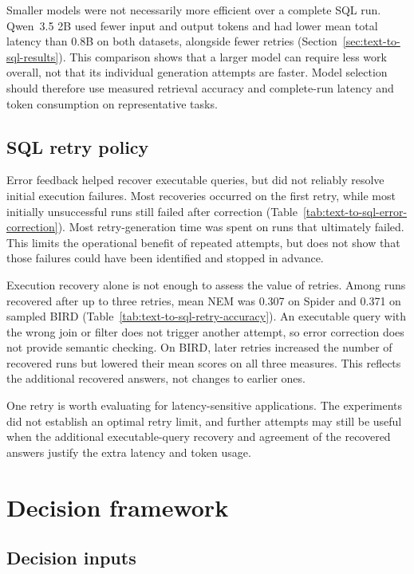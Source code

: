 Smaller models were not necessarily more efficient over a complete SQL run. Qwen~3.5 2B used fewer input and
output tokens and had lower mean total latency than \num{0.8}B on both datasets, alongside fewer retries
(Section~\ref{sec:text-to-sql-results}). This comparison shows that a larger model can require
less work overall, not that its individual generation attempts are faster. Model selection should therefore
use measured retrieval accuracy and complete-run latency and token consumption on representative tasks.

\subsection{SQL retry policy} \label{sec:sql-error-correction}

Error feedback helped recover executable queries, but did not reliably resolve initial execution failures.
Most recoveries occurred on the first retry, while most initially unsuccessful runs still failed after
correction (Table~\ref{tab:text-to-sql-error-correction}). Most retry-generation time was spent on runs that
ultimately failed. This limits the operational benefit of repeated attempts, but does not show that those
failures could have been identified and stopped in advance.

Execution recovery alone is not enough to assess the value of retries. Among runs recovered after up to
three retries, mean NEM was \num{0.307} on Spider and \num{0.371} on sampled BIRD
(Table~\ref{tab:text-to-sql-retry-accuracy}). An executable query with the wrong join or filter does not
trigger another attempt, so error correction does not provide semantic checking. On BIRD, later retries
increased the number of recovered runs but lowered their mean scores on all three measures. This reflects
the additional recovered answers, not changes to earlier ones.

One retry is worth evaluating for latency-sensitive applications. The experiments did not establish an
optimal retry limit, and further attempts may still be useful when the additional executable-query recovery
and agreement of the recovered answers justify the extra latency and token usage.

\section{Decision framework} \label{sec:decision-framework}

\subsection{Decision inputs}

